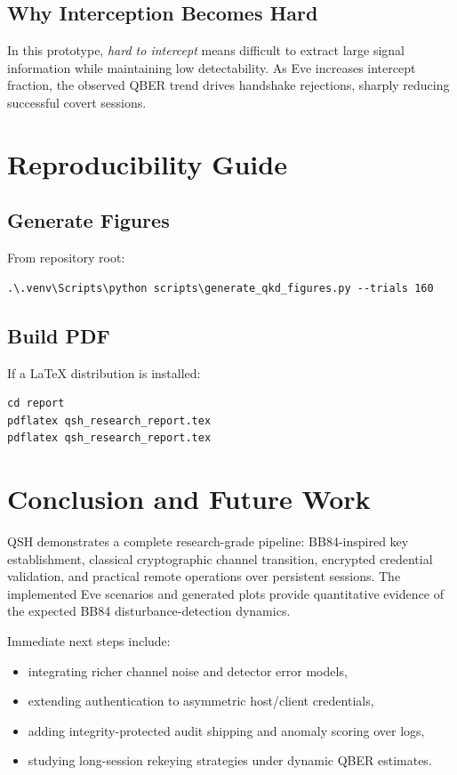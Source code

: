 \documentclass[11pt,a4paper]{article}
\begin{document}
\subsection{Why Interception Becomes Hard}
In this prototype, \emph{hard to intercept} means difficult to extract large signal information while maintaining low detectability. As Eve increases intercept fraction, the observed QBER trend drives handshake rejections, sharply reducing successful covert sessions.

\section{Reproducibility Guide}
\subsection{Generate Figures}
From repository root:
\begin{verbatim}
.\.venv\Scripts\python scripts\generate_qkd_figures.py --trials 160
\end{verbatim}

\subsection{Build PDF}
If a LaTeX distribution is installed:
\begin{verbatim}
cd report
pdflatex qsh_research_report.tex
pdflatex qsh_research_report.tex
\end{verbatim}

\section{Conclusion and Future Work}
QSH demonstrates a complete research-grade pipeline: BB84-inspired key establishment, classical cryptographic channel transition, encrypted credential validation, and practical remote operations over persistent sessions. The implemented Eve scenarios and generated plots provide quantitative evidence of the expected BB84 disturbance-detection dynamics.

Immediate next steps include:
\begin{itemize}[leftmargin=1.5em]
  \item integrating richer channel noise and detector error models,
  \item extending authentication to asymmetric host/client credentials,
  \item adding integrity-protected audit shipping and anomaly scoring over logs,
  \item studying long-session rekeying strategies under dynamic QBER estimates.
\end{itemize}
\end{document}
